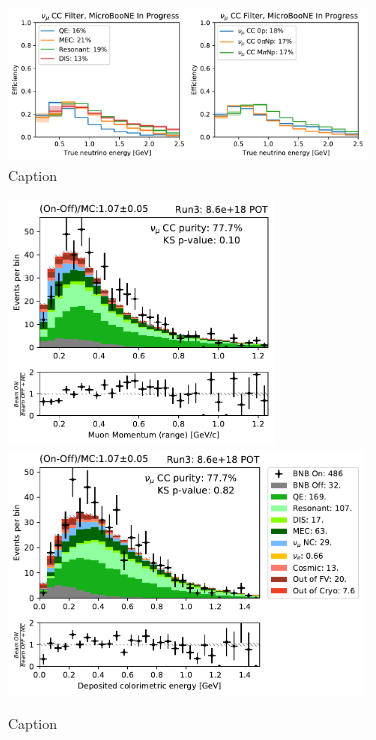 \begin{figure}[H]
    \centering
    \includegraphics[width=0.85\textwidth]{NuMuCCsel/Images/run3/numu_efficiency_run3.pdf}
    \caption{Caption}
    \label{fig:numu_eff_r3}
\end{figure}


\begin{figure}[H]
    \centering
    \includegraphics[height=6.5cm]{NuMuCCsel/Images/run3/numu_rangemom_run3.pdf} \hspace{2mm}
    \includegraphics[height=6.5cm]{NuMuCCsel/Images/run3/numu_caloe_run3.pdf}
    \caption{Caption}
    \label{fig:numu_energy}
\end{figure}

